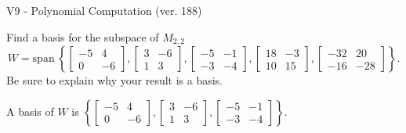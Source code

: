 \begin{exercise}
  \begin{exerciseTitle}V9 - Polynomial Computation (ver. 188)\end{exerciseTitle}
  \begin{exerciseStatement}
    Find a basis for the subspace of \(M_{2,2}\) 
\[W=\mathrm{span}\ \left\{\left[\begin{array}{cc}
-5 & 4 \\
0 & -6
\end{array}\right] , \left[\begin{array}{cc}
3 & -6 \\
1 & 3
\end{array}\right] , \left[\begin{array}{cc}
-5 & -1 \\
-3 & -4
\end{array}\right] , \left[\begin{array}{cc}
18 & -3 \\
10 & 15
\end{array}\right] , \left[\begin{array}{cc}
-32 & 20 \\
-16 & -28
\end{array}\right]\right\}.\]
 Be sure to explain why your result is a basis.


  \end{exerciseStatement}
  \begin{exerciseAnswer}
   A basis of \(W\) is  \(\left\{\left[\begin{array}{cc}
-5 & 4 \\
0 & -6
\end{array}\right] , \left[\begin{array}{cc}
3 & -6 \\
1 & 3
\end{array}\right] , \left[\begin{array}{cc}
-5 & -1 \\
-3 & -4
\end{array}\right]\right\}\).
  


  \end{exerciseAnswer}
\end{exercise}